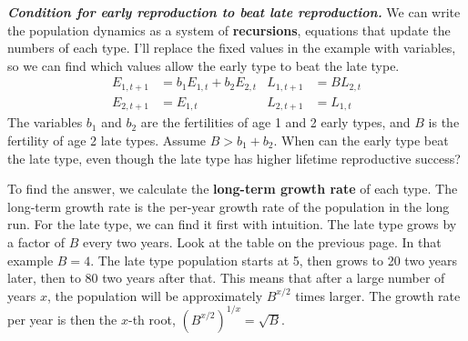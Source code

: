 \documentclass[10pt,reqno]{amsbook}
\newcommand{\bemph}[1]{{\textbf{\textcolor{bemphcol}{#1}}}}
\numberwithin{equation}{chapter}
\newenvironment{mathbox}[2]
{\begin{table}[#1]
\justify\begin{tcolorbox}[enhanced, oversize]\footnotesize\noindent\textbf{\emph{#2}}}
{\end{tcolorbox}\end{table}}
\begin{document}
\begin{mathbox}{p}{Condition for early reproduction to beat late reproduction.}
We can write the population dynamics as a system of \bemph{recursions}, equations that update the numbers of each type. I'll replace the fixed values in the example with variables, so we can find which values allow the early type to beat the late type.
\begin{align*}
	E_{1,t+1} &= b_1 E_{1,t} + b_2 E_{2,t} &
	L_{1,t+1} &= B L_{2,t} \\
	E_{2,t+1} &= E_{1,t} &
	L_{2,t+1} &= L_{1,t}
\end{align*}
The variables $b_1$ and $b_2$ are the fertilities of age 1 and 2 early types, and $B$ is the fertility of age 2 late types. Assume $B > b_1 + b_2$. When can the early type beat the late type, even though the late type has higher lifetime reproductive success?

To find the answer, we calculate the \bemph{long-term growth rate} of each type. The long-term growth rate is the per-year growth rate of the population in the long run. For the late type, we can find it first with intuition. The late type grows by a factor of $B$ every two years. Look at the table on the previous page. In that example $B=4$.  The late type population starts at 5, then grows to 20 two years later, then to 80 two years after that. This means that after a large number of years $x$, the population will be approximately $B^{x/2}$ times larger. The growth rate per year is then the $x$-th root, $(B^{x/2})^{1/x}=\sqrt{B}$. 


\end{mathbox}
\end{document}
